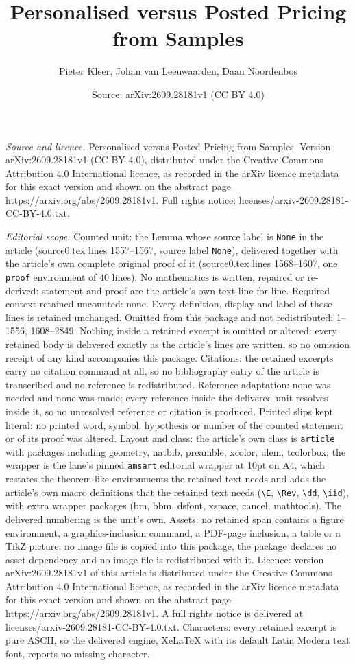 \documentclass[10pt,a4paper]{amsart}
\title[Personalised versus Posted Pricing from Samples]{Personalised versus Posted Pricing from Samples}
\author{Pieter Kleer, Johan van Leeuwaarden, Daan Noordenbos}
\date{Source: arXiv:2609.28181v1 (CC BY 4.0)}
\begin{document}
\maketitle

\noindent\emph{Source and licence.} Personalised versus Posted Pricing from Samples. Version arXiv:2609.28181v1 (CC BY 4.0), distributed under the Creative Commons Attribution 4.0 International licence, as recorded in the arXiv licence metadata for this exact version and shown on the abstract page https://arxiv.org/abs/2609.28181v1. Full rights notice: licenses/arxiv-2609.28181-CC-BY-4.0.txt.\par\smallskip

\noindent\textit{Editorial scope.} Counted unit: the Lemma whose source label is \texttt{None} in the article (source0.tex lines 1557--1567, source label \texttt{None}), delivered together with the article's own complete original proof of it (source0.tex lines 1568--1607, one \texttt{proof} environment of 40 lines). No mathematics is written, repaired or re-derived: statement and proof are the article's own text line for line. Required context retained uncounted: none. Every definition, display and label of those lines is retained unchanged. Omitted from this package and not redistributed: 1--1556, 1608--2849. Nothing inside a retained excerpt is omitted or altered: every retained body is delivered exactly as the article's lines are written, so no omission receipt of any kind accompanies this package. Citations: the retained excerpts carry no citation command at all, so no bibliography entry of the article is transcribed and no reference is redistributed. Reference adaptation: none was needed and none was made; every reference inside the delivered unit resolves inside it, so no unresolved reference or citation is produced. Printed slips kept literal: no printed word, symbol, hypothesis or number of the counted statement or of its proof was altered. Layout and class: the article's own class is \texttt{article} with packages including geometry, natbib, preamble, xcolor, ulem, tcolorbox; the wrapper is the lane's pinned \texttt{amsart} editorial wrapper at 10pt on A4, which restates the theorem-like environments the retained text needs and adds the article's own macro definitions that the retained text needs (\texttt{\textbackslash E}, \texttt{\textbackslash Rev}, \texttt{\textbackslash dd}, \texttt{\textbackslash iid}), with extra wrapper packages (bm, bbm, dsfont, xspace, cancel, mathtools). The delivered numbering is the unit's own. Assets: no retained span contains a figure environment, a graphics-inclusion command, a PDF-page inclusion, a table or a TikZ picture; no image file is copied into this package, the package declares no asset dependency and no image file is redistributed with it. Licence: version arXiv:2609.28181v1 of this article is distributed under the Creative Commons Attribution 4.0 International licence, as recorded in the arXiv licence metadata for this exact version and shown on the abstract page https://arxiv.org/abs/2609.28181v1. A full rights notice is delivered at licenses/arxiv-2609.28181-CC-BY-4.0.txt. Characters: every retained excerpt is pure ASCII, so the delivered engine, XeLaTeX with its default Latin Modern text font, reports no missing character.
\end{document}
